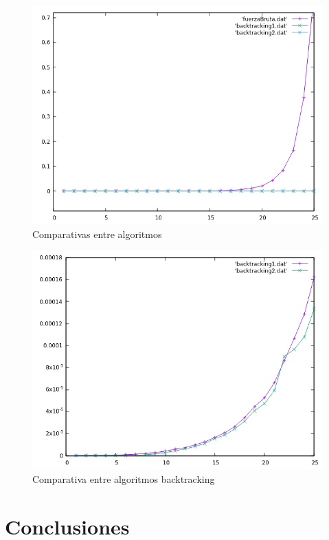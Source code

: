 \documentclass[12pt,spanish]{article}
\begin{document}
\begin{figure}[H]
\centering
	\includegraphics[scale=0.75]{todos.png}
	\caption{Comparativas entre algoritmos}
\end{figure}

\begin{figure}[H]
\centering
	\includegraphics[scale=0.75]{ambos_backtracking.png}
	\caption{Comparativa entre algoritmos backtracking}
\end{figure}

\newpage

\section{Conclusiones}
\end{document}
